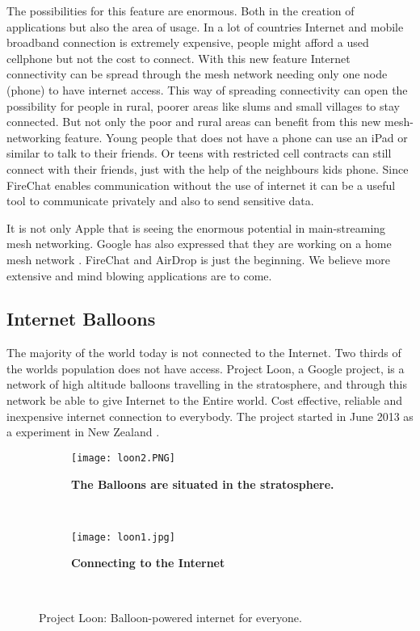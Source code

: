 The possibilities for this feature are enormous. Both in the creation of applications but also the area of usage. In a lot of countries Internet and mobile broadband connection is extremely expensive, people might afford a used cellphone but not the cost to connect. With this new feature Internet connectivity can be spread through the mesh network needing only one node (phone) to have internet access. This way of spreading connectivity can open the possibility for people in rural, poorer areas like slums and small villages to stay connected. But not only the poor and rural areas can benefit from this new mesh-networking feature. Young people that does not have a phone can use an iPad or similar to talk to their friends. Or teens with restricted cell contracts can still connect with their friends, just with the help of the neighbours kids phone. Since FireChat enables communication without the use of internet it can be a useful tool to communicate privately and also to send sensitive data.
 
It is not only Apple that is seeing the enormous potential in main-streaming mesh networking. Google has also expressed that they are working on a home mesh network \cite{googleMesh}. FireChat and AirDrop is just the beginning. We believe more extensive and mind blowing applications are to come. 


\subsection{Internet Balloons}
The majority of the world today is not connected to the Internet. Two thirds of the worlds population does not have access. Project Loon, a Google project, is a network of high altitude balloons travelling in the stratosphere, and through this network be able to give Internet to the Entire world. Cost effective, reliable and inexpensive internet connection to everybody. The project started in June 2013 as a experiment in New Zealand \cite{loon}. 

\begin{figure}
        \centering
        \begin{subfigure}[t]{0.43\textwidth}
                \texttt{[image: loon2.PNG]}
                \caption[The Balloons are situated in the stratosphere]{\textbf{The Balloons are situated in the stratosphere.}} 
                \label{fig:loonStratosphere}
        \end{subfigure}%
        ~ %
        \begin{subfigure}[t]{0.415\textwidth}
                \texttt{[image: loon1.jpg]}
               \caption[Connecting to the Internet]							{\textbf{Connecting to the Internet}} 
                \label{fig:loonConnect}
        \end{subfigure}
        ~ %
        \caption{Project Loon: Balloon-powered internet for everyone.}\label{fig:loon}
\end{figure}

